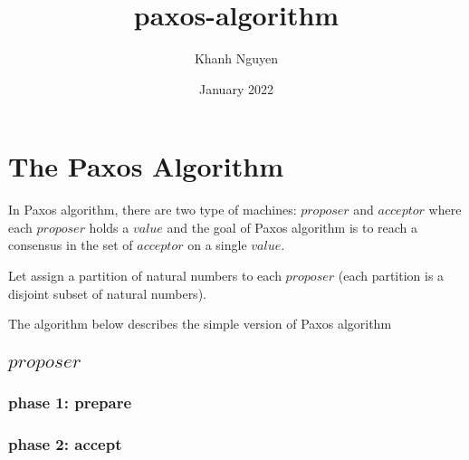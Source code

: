 \documentclass{article}
\title{paxos-algorithm}
\author{Khanh Nguyen}
\date{January 2022}
\begin{document}
\maketitle

\section{The Paxos Algorithm}

    In Paxos algorithm, there are two type of machines: $proposer$ and $acceptor$ where each $proposer$ holds a $value$ and the goal of Paxos algorithm is to reach a consensus in the set of $acceptor$ on a single $value$.

    Let assign a partition of natural numbers to each $proposer$ (each partition is a disjoint subset of natural numbers).
    
    The algorithm below describes the simple version of Paxos algorithm \cite{lamport2001paxos}
    
    \subsection{$proposer$}
    \label{algorithm:proposer}
    
    \subsubsection{phase 1: prepare}
    \label{algorithm:proposer:prepare}
    
    
    \subsubsection{phase 2: accept}
    \label{algorithm:proposer:accept}
    
\end{document}
